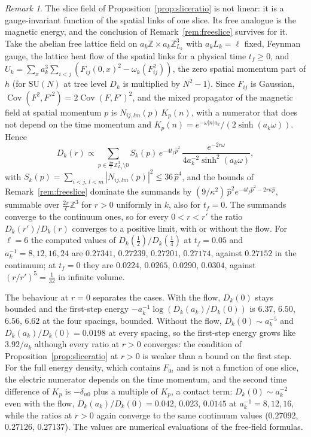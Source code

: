 \documentclass[aps,prd,twocolumn,superscriptaddress,nofootinbib,longbibliography,floatfix,amsmath,amssymb,10pt]{revtex4-2}
\theoremstyle{definition}
\theoremstyle{remark}
\newtheorem{remark}[theorem]{Remark}
\newcommand{\Z}{\mathbb{Z}}
\newcommand{\SU}{\mathrm{SU}}
\begin{document}
\begin{remark}\label{rem:compositeslice}
The slice field of Proposition~\ref{prop:sliceratio} is not linear: it is a
gauge-invariant function of the spatial links of one slice. Its free analogue
is the magnetic energy, and the conclusion of Remark~\ref{rem:freeslice}
survives for it. Take the abelian free lattice field on $a_k\Z\times
a_k\Z^3_{L_k}$ with $a_kL_k=\ell$ fixed, Feynman gauge, the lattice heat flow
of the spatial links for a physical time $t_f\ge0$, and
$U_k=\sum_x a_k^3\sum_{i<j}(F_{ij}(0,x)^2-\omega_k(F_{ij}^2))$, the zero
spatial momentum part of $h$ (for $\SU(N)$ at tree level $D_k$ is multiplied by
$N^2-1$). Since $F_{ij}$ is Gaussian, $\operatorname{Cov}(F^2,F'^2)=2\operatorname{Cov}(F,F')^2$,
and the mixed propagator of the magnetic field at spatial momentum $p$ is
$N_{ij,lm}(p)\,K_p(n)$, with a numerator that does not depend on the time
momentum and $K_p(n)=e^{-\omega|n|a_k}/(2\sinh(a_k\omega))$. Hence
\[
D_k(r)\propto\sum_{p\in\frac{2\pi}\ell\Z^3_{L_k}\setminus0}
S_k(p)\,e^{-4t_f\hat p^2}\,\frac{e^{-2r\omega}}{4a_k^{-2}\sinh^2(a_k\omega)},
\]
with $S_k(p)=\sum_{i<j,\,l<m}|N_{ij,lm}(p)|^2\le36\,\hat p^4$,
and the bounds of Remark~\ref{rem:freeslice} dominate the summands by
$(9/\kappa^2)\,\hat p^2e^{-4t_f\hat p^2-2r\kappa\hat p}$, summable over
$\frac{2\pi}\ell\Z^3$ for $r>0$ uniformly in $k$, also for $t_f=0$. The summands
converge to the continuum ones, so for every $0<r<r'$ the ratio
$D_k(r')/D_k(r)$ converges to a positive limit, with or without the flow. For
$\ell=6$ the computed values of $D_k(\frac12)/D_k(\frac14)$ at $t_f=0.05$ and
$a_k^{-1}=8,12,16,24$ are $0.27341$, $0.27239$, $0.27201$, $0.27174$, against
$0.27152$ in the continuum; at $t_f=0$ they are $0.0224$, $0.0265$,
$0.0290$, $0.0304$, against $(r/r')^5=\frac1{32}$ in infinite volume.

The behaviour at $r=0$ separates the cases. With the flow, $D_k(0)$ stays
bounded and the first-step energy $-a_k^{-1}\log(D_k(a_k)/D_k(0))$ is $6.37$,
$6.50$, $6.56$, $6.62$ at the four spacings, bounded. Without the flow,
$D_k(0)\sim a_k^{-5}$ and $D_k(a_k)/D_k(0)=0.0198$ at every spacing, so the
first-step energy grows like $3.92/a_k$ although every ratio at $r>0$
converges: the condition of Proposition~\ref{prop:sliceratio} at $r>0$ is
weaker than a bound on the first step. For the full energy density, which
contains $F_{0i}$ and is not a function of one slice, the electric numerator
depends on the time momentum, and the second time difference of $K_p$ is
$-\delta_{n0}$ plus a multiple of $K_p$, a contact term: $D_k(0)\sim a_k^{-2}$ even with the flow, $D_k(a_k)/D_k(0)=0.042$,
$0.023$, $0.0145$ at $a_k^{-1}=8,12,16$, while the ratios at $r>0$ again
converge to the same continuum values ($0.27092$, $0.27126$, $0.27137$). The
values are numerical evaluations of the free-field formulas.


\end{remark}
\end{document}
